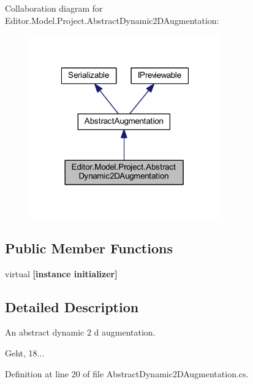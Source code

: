 Collaboration diagram for Editor.\-Model.\-Project.\-Abstract\-Dynamic2\-D\-Augmentation\-:
\nopagebreak
\begin{figure}[H]
\begin{center}
\leavevmode
\includegraphics[width=235pt]{class_editor_1_1_model_1_1_project_1_1_abstract_dynamic2_d_augmentation__coll__graph}
\end{center}
\end{figure}
\subsection*{Public Member Functions}
\begin{DoxyCompactItemize}
\item 
virtual {\bfseries [instance initializer]}\label{class_editor_1_1_model_1_1_project_1_1_abstract_dynamic2_d_augmentation_a9d9677fc74f7086eede97e342d41a6cd}

\end{DoxyCompactItemize}


\subsection{Detailed Description}
An abstract dynamic 2 d augmentation. 

Geht, 18... 

Definition at line 20 of file Abstract\-Dynamic2\-D\-Augmentation.\-cs.

